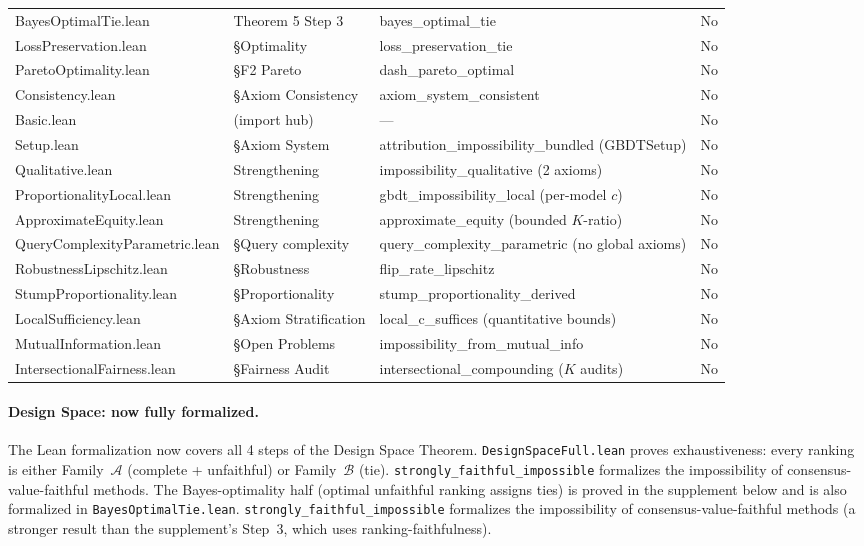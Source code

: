 \documentclass{article}
\begin{document}
\begin{table}[htbp]
\begin{tabular}{@{}l>{\raggedright\arraybackslash}p{3cm}>{\raggedright\arraybackslash}p{5.5cm}l@{}}
BayesOptimalTie.lean & Theorem 5 Step 3 & bayes\_optimal\_tie & No \\
LossPreservation.lean & \S Optimality & loss\_preservation\_tie & No \\
ParetoOptimality.lean & \S F2 Pareto & dash\_pareto\_optimal & No \\
Consistency.lean & \S Axiom Consistency & axiom\_system\_consistent & No \\
Basic.lean & (import hub) & --- & No \\
Setup.lean & \S Axiom System & attribution\_impossibility\_bundled (GBDTSetup) & No \\
Qualitative.lean & Strengthening & impossibility\_qualitative (2 axioms) & No \\
ProportionalityLocal.lean & Strengthening & gbdt\_impossibility\_local (per-model $c$) & No \\
ApproximateEquity.lean & Strengthening & approximate\_equity (bounded $K$-ratio) & No \\
QueryComplexityParametric.lean & \S Query complexity & query\_complexity\_parametric (no global axioms) & No \\
RobustnessLipschitz.lean & \S Robustness & flip\_rate\_lipschitz & No \\
StumpProportionality.lean & \S Proportionality & stump\_proportionality\_derived & No \\
LocalSufficiency.lean & \S Axiom Stratification & local\_c\_suffices (quantitative bounds) & No \\
MutualInformation.lean & \S Open Problems & impossibility\_from\_mutual\_info & No \\
IntersectionalFairness.lean & \S Fairness Audit & intersectional\_compounding ($K$ audits) & No \\
\bottomrule
\end{tabular}
\end{table}

\paragraph{Design Space: now fully formalized.}
The Lean formalization now covers all 4 steps of the Design Space Theorem.
\texttt{DesignSpaceFull.lean} proves exhaustiveness: every ranking is
either Family~$\mathcal{A}$ (complete + unfaithful) or Family~$\mathcal{B}$
(tie). \texttt{strongly\_faithful\_impossible} formalizes the impossibility
of consensus-value-faithful methods.
The Bayes-optimality half (optimal unfaithful ranking assigns ties) is
proved in the supplement below and is also formalized in
\texttt{BayesOptimalTie.lean}. \texttt{strongly\_faithful\_impossible}
formalizes the impossibility of consensus-value-faithful methods (a
stronger result than the supplement's Step~3, which uses
ranking-faithfulness).
\end{document}
